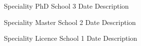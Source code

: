 \begin{cventries}
  \cventry
    {\textnormal{Speciality}}
    {PhD}
    {School 3}
    {Date}
    {Description}
    \vspace{5mm} 
    
  \cventry
    {\textnormal{Speciality}}
    {Master}
    {School 2}
    {Date}
    {Description}
    
    \vspace{5mm}
    \cventry
    {\textnormal{Speciality}}
    {Licence}
    {School 1}
    {Date}
    {Description}
    \vspace{1 cm} 
    
\end{cventries}